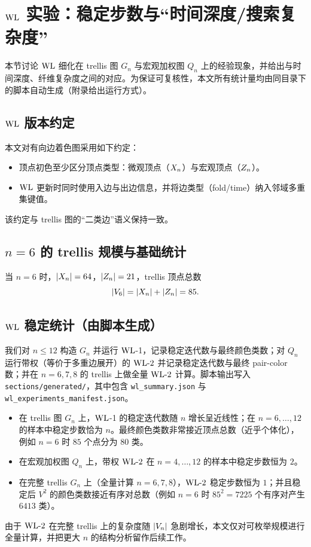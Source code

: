 
\section{$\mathrm{WL}$ 实验：稳定步数与“时间深度/搜索复杂度”}

本节讨论 $\mathrm{WL}$ 细化在 trellis 图 $G_n$ 与宏观加权图 $Q_n$ 上的经验现象，并给出与时间深度、纤维复杂度之间的对应。为保证可复核性，本文所有统计量均由同目录下的脚本自动生成（附录给出运行方式）。

\subsection{$\mathrm{WL}$ 版本约定}\label{sec:wl_experiments_convention}

本文对有向边着色图采用如下约定：
\begin{itemize}
  \item 顶点初色至少区分顶点类型：微观顶点（$X_n$）与宏观顶点（$Z_n$）。
  \item $\mathrm{WL}$ 更新时同时使用入边与出边信息，并将边类型（fold/time）纳入邻域多重集键值。
\end{itemize}
该约定与 trellis 图的“二类边”语义保持一致。

\subsection{$n=6$ 的 trellis 规模与基础统计}

当 $n=6$ 时，$\left\lvert X_n\right\rvert=64$，$\left\lvert Z_n\right\rvert=21$，trellis 顶点总数
$$
\left\lvert V_6\right\rvert=\left\lvert X_n\right\rvert+\left\lvert Z_n\right\rvert=85.
$$

\subsection{$\mathrm{WL}$ 稳定统计（由脚本生成）}

我们对 $n\le 12$ 构造 $G_n$ 并运行 $\mathrm{WL}$-1，记录稳定迭代数与最终颜色类数；对 $Q_n$ 运行带权（等价于多重边展开）的 $\mathrm{WL}\text{-}2$ 并记录稳定迭代数与最终 pair-color 数；并在 $n=6,7,8$ 的 trellis 上做全量 $\mathrm{WL}\text{-}2$ 计算。脚本输出写入 \texttt{sections/generated/}，其中包含 \texttt{wl\_summary.json} 与 \texttt{wl\_experiments\_manifest.json}。
\begin{itemize}
  \item 在 trellis 图 $G_n$ 上，$\mathrm{WL}$-1 的稳定迭代数随 $n$ 增长呈近线性；在 $n=6,\ldots,12$ 的样本中稳定步数恰为 $n$。最终颜色类数非常接近顶点总数（近乎个体化），例如 $n=6$ 时 $85$ 个点分为 $80$ 类。
  \item 在宏观加权图 $Q_n$ 上，带权 $\mathrm{WL}\text{-}2$ 在 $n=4,\ldots,12$ 的样本中稳定步数恒为 $2$。
  \item 在完整 trellis $G_n$ 上（全量计算 $n=6,7,8$），$\mathrm{WL}\text{-}2$ 稳定步数恒为 $1$；并且稳定后 $V^2$ 的颜色类数接近有序对总数（例如 $n=6$ 时 $85^2=7225$ 个有序对产生 $6413$ 类）。
\end{itemize}



\begin{remark}
由于 $\mathrm{WL}\text{-}2$ 在完整 trellis 上的复杂度随 $\left\lvert V_n\right\rvert$ 急剧增长，本文仅对可枚举规模进行全量计算，并把更大 $n$ 的结构分析留作后续工作。
\end{remark}

